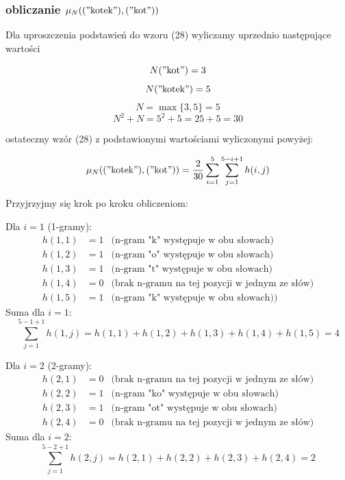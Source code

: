 \documentclass{article}
\begin{document}
\subsubsection*{obliczanie \( \mu_N(("\text{kotek}"), ("\text{kot}")) \)}

\noindent Dla uproszczenia podstawień do wzoru (28) wyliczamy uprzednio następujące wartości 


\[  N("\text{kot}") = 3 \]
\[ N("\text{kotek}") = 5 \]
\[ N = \max\{3, 5\} = 5 \]
\[ N^2 + N = 5^2 + 5 = 25 + 5 = 30 \]



\noindent ostateczny wzór (28) z podstawionymi wartościami wyliczonymi powyżej:

\begin{equation}
    \mu_N(("\text{kotek}"), ("\text{kot}")) = \frac{2}{30} \sum_{i=1}^{5} \sum_{j=1}^{5-i+1} h(i, j)
\end{equation}

\noindent Przyjrzyjmy się krok po kroku obliczeniom: \newline

\noindent Dla \( i = 1 \) (1-gramy):
\begin{align*}
    h(1, 1) &= 1 & \text{(n-gram "k" występuje w obu słowach)} \\
    h(1, 2) &= 1 & \text{(n-gram "o" występuje w obu słowach)} \\
    h(1, 3) &= 1 & \text{(n-gram "t" występuje w obu słowach)} \\
    h(1, 4) &= 0 & \text{(brak n-gramu na tej pozycji w jednym ze słów)} \\
    h(1, 5) &= 1 & \text{(n-gram "k" występuje w obu słowach))}
\end{align*}
Suma dla \( i = 1 \):
\begin{equation}
\sum_{j=1}^{5-1+1} h(1, j) = h(1, 1) + h(1, 2) + h(1, 3) + h(1, 4) + h(1, 5) = 4
\end{equation}

\noindent Dla \( i = 2 \) (2-gramy):
\begin{align*}
    h(2, 1) &= 0 & \text{(brak n-gramu na tej pozycji w jednym ze słów)} \\
    h(2, 2) &= 1 & \text{(n-gram "ko" występuje w obu słowach)} \\
    h(2, 3) &= 1 & \text{(n-gram "ot" występuje w obu słowach)} \\
    h(2, 4) &= 0 & \text{(brak n-gramu na tej pozycji w jednym ze słów)}
\end{align*}
Suma dla \( i = 2 \):
\begin{equation}
\sum_{j=1}^{5-2+1} h(2, j) = h(2, 1) + h(2, 2) + h(2, 3) + h(2, 4) = 2
\end{equation}
\end{document}
